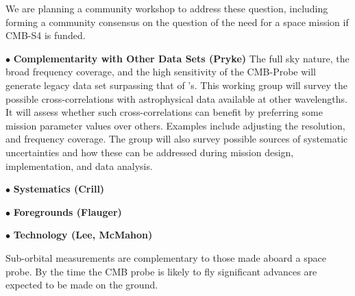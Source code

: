 We are planning a community workshop to address these question, including forming a community consensus on the 
question of the need for a space mission if CMB-S4 is funded. 

$\bullet$ {\bf Complementarity with Other Data Sets (Pryke)} \hspace{0.1in}
The full sky nature, the broad frequency coverage, and the high sensitivity of the CMB-Probe will generate legacy 
data set surpassing that of \planck 's. This working group will survey the possible cross-correlations with astrophysical 
data available at other wavelengths. It will assess whether such cross-correlations can benefit by preferring 
some mission parameter values over others. Examples include adjusting the resolution, and frequency coverage. 
The group will also survey possible sources of systematic uncertainties and how these can be addressed during mission 
design, implementation, and data analysis. 

$\bullet$ {\bf Systematics (Crill)} \hspace{0.1in}

$\bullet$ {\bf Foregrounds (Flauger) } \hspace{0.1in}

$\bullet$ {\bf Technology (Lee, McMahon)} \hspace{0.1in}


Sub-orbital measurements are complementary to those made aboard a space probe. By the time the \ac{CMB} probe is likely to fly significant advances are expected to be made on the ground. 

